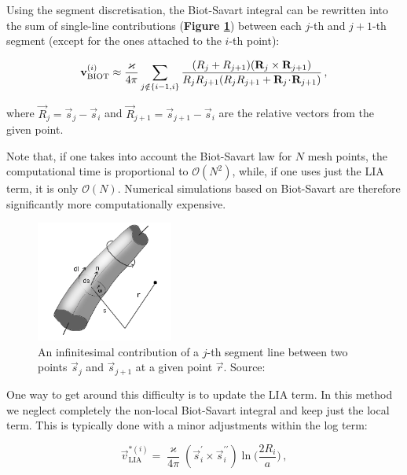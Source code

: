Using the segment discretisation, the Biot-Savart integral can be rewritten \cite{samuels} into the sum of single-line contributions (\textbf{Figure \ref{element}}) between each $j$-th and $j+1$-th segment (except for the ones attached to the $i$-th point):

\begin{equation}
\mathbf{v}_{\text{BIOT}}^{(i)} \approx
\frac{\varkappa}{4\pi}
\sum_{j \notin \{i-1, i\}}
\frac{(R_j + R_{j+1}) (\mathbf{R}_j \times \mathbf{R}_{j+1})}{R_j R_{j+1} (R_j R_{j+1} + \mathbf{R}_j \!\cdot\! \mathbf{R}_{j+1})}\,,
\end{equation}

where $\vec{R}_j = \vec{s}_j - \vec{s}_i$ and $\vec{R}_{j+1} = \vec{s}_{j+1} - \vec{s}_i$ are the relative vectors from the given point.

Note that, if one takes into account the Biot-Savart law for $N$ mesh points, the computational time is proportional to $\mathcal{O}(N^2)$, while, if one uses just the LIA term, it is only $\mathcal{O}(N)$. Numerical simulations based on Biot-Savart are therefore significantly more computationally expensive.

\begin{figure}[h]
	\centering
	\includegraphics[width=0.4\textwidth]{graphics/simul/biot}
	\caption{An infinitesimal contribution of a $j$-th segment line between two points $\vec{s}_j$ and $\vec{s}_{j+1}$ at a given point $\vec{r}$. Source: \cite{element}}
	\label{element}
\end{figure}

One way to get around this difficulty is to update the LIA term. In this method we neglect completely the non-local Biot-Savart integral and keep just the local term. This is typically done with a minor adjustments within the log term:

\begin{equation}
\vec{v}_{\text{LIA}}^{*(i)} =
\frac{\varkappa}{4\pi} (\vec{s}^{\prime}_i \times \vec{s}^{\prime \prime}_i)
\ln{\Bigg(\frac{2 R_i}{a}\Bigg)}\,,
\label{LIAnew}
\end{equation}

